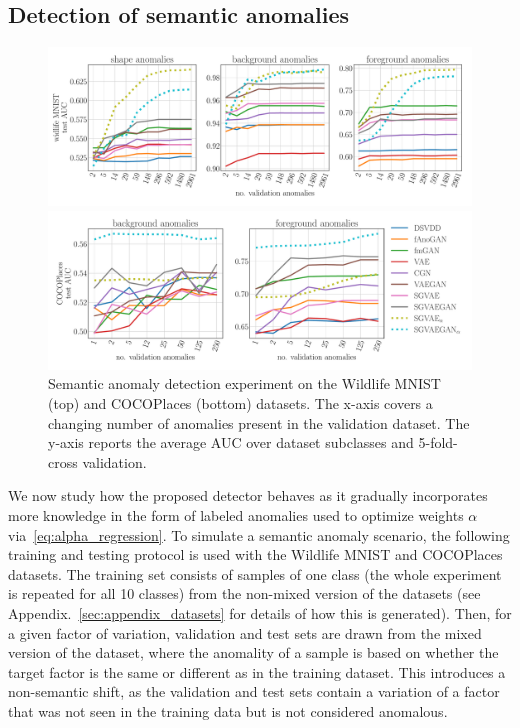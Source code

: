 \subsection{Detection of semantic anomalies} 
\begin{figure}[ht!]
    \centering
    \includegraphics[width=\textwidth]{data/chapter_sgvaegan/fig6_multifactor_experiments_wmnist.pdf}
    
    \includegraphics[width=\textwidth]{data/chapter_sgvaegan/fig7_multifactor_experiments_coco.pdf}
    \caption{Semantic anomaly detection experiment on the Wildlife MNIST (top) and COCOPlaces (bottom) datasets. The x-axis covers a changing number of anomalies present in the validation dataset. The y-axis reports the average AUC over dataset subclasses and 5-fold-cross validation.}
    \label{fig:multifactor}
\end{figure}
We now study how the proposed detector behaves as it gradually incorporates more knowledge in the form of labeled anomalies used to optimize weights $\alpha$ via~\eqref{eq:alpha_regression}. To simulate a semantic anomaly scenario, the following training and testing protocol is used with the Wildlife MNIST and COCOPlaces datasets. The training set consists of samples of one class (the whole experiment is repeated for all 10 classes) from the non-mixed version of the datasets (see Appendix.~\ref{sec:appendix_datasets} for details of how this is generated). Then, for a given factor of variation, validation and test sets are drawn from the mixed version of the dataset, where the anomality of a sample is based on whether the target factor is the same or different as in the training dataset. This introduces a non-semantic shift, as the validation and test sets contain a variation of a factor that was not seen in the training data but is not considered anomalous. 


